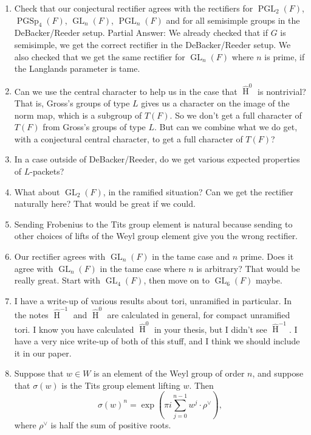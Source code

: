 \documentclass{article}
\DeclareMathOperator{\HH}{H}
\DeclareMathOperator{\GL}{GL}
\DeclareMathOperator{\PGL}{PGL}
\DeclareMathOperator{\PGSp}{PGSp}
\newcommand{\HT}[1]{\widehat{\HH}^{#1}}
\begin{document}
\begin{enumerate}
\item Check that our conjectural rectifier agrees with the rectifiers for $\PGL_2(F)$, $\PGSp_4(F)$, $\GL_n(F)$, $\PGL_n(F)$ and for all semisimple groups in the DeBacker/Reeder setup.  Partial Answer: We already checked that if $G$ is semisimple, we get the correct rectifier in the DeBacker/Reeder setup. We also checked that we get the same rectifier for $\GL_n(F)$ where $n$ is prime, if the Langlands parameter is tame.

\item Can we use the central character to help us in the case that $\HT{0}$ is nontrivial?  That is, Gross's groups of type $L$ gives us a character on the image of the norm map, which is a subgroup of $T(F)$.  So we don't get a full character of $T(F)$ from Gross's groups of type $L$.  But can we combine what we do get, with a conjectural central character, to get a full character of $T(F)$?

\item In a case outside of DeBacker/Reeder, do we get various expected properties of $L$-packets?

\item What about $\GL_2(F)$, in the ramified situation?  Can we get the rectifier naturally here?  That would be great if we could.

\item Sending Frobenius to the Tits group element is natural because sending to other choices of lifts of the Weyl group element give you the wrong rectifier.

\item Our rectifier agrees with $\GL_n(F)$ in the tame case and $n$ prime.  Does it agree with $\GL_n(F)$ in the tame case where $n$ is arbitrary?  That would be really great.  Start with $\GL_4(F)$, then move on to $\GL_6(F)$ maybe.

\item I have a write-up of various results about tori, unramified in particular.  In the notes $\HT{-1}$ and $\HT{0}$ are calculated in general, for compact unramified tori.  I know you have calculated $\HT{0}$ in your thesis, but I didn't see $\HT{-1}$.  I have a very nice write-up of both of this stuff, and I think we should include it in our paper.

\item Suppose that $w \in W$ is an element of the Weyl group of order $n$, and suppose that $\sigma(w)$ is the Tits group element lifting $w$.  Then
$$\sigma(w)^n = \exp\left(\pi i \sum_{j=0}^{n-1} w^j \cdot \rho^\vee\right),$$
where $\rho^{\vee}$ is half the sum of positive roots.


\end{enumerate}
\end{document}
